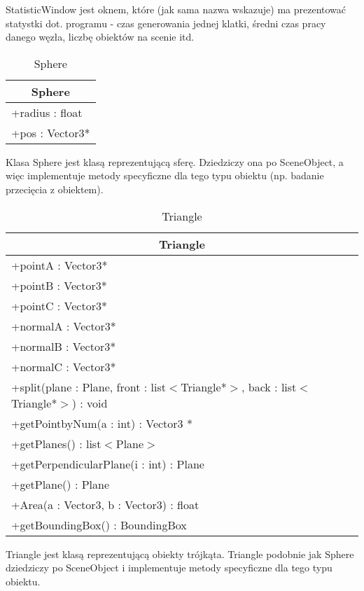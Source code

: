 StatisticWindow jest oknem, które (jak sama nazwa wskazuje) ma prezentować statystki dot. programu - czas generowania jednej klatki, średni czas pracy danego węzła, liczbę obiektów na scenie itd.

\begin{longtable}{|p{16cm}|}
    \caption{Sphere} \label{tab:Sphere} \\ \hline
    \multicolumn{1}{|c|}{Sphere} \\ \hline
    +radius : float \\
    +pos : Vector3* \\
    \hline
\end{longtable}

Klasa Sphere jest klasą reprezentującą sferę. Dziedziczy ona po SceneObject, a więc implementuje metody specyficzne dla tego typu obiektu (np. badanie przecięcia z obiektem).

\begin{longtable}{|p{16cm}|}
    \caption{Triangle} \label{tab:Triangle} \\ \hline
    \multicolumn{1}{|c|}{Triangle} \\ \hline
    +pointA : Vector3* \\
    +pointB : Vector3* \\
    +pointC : Vector3* \\
    +normalA : Vector3* \\
    +normalB : Vector3* \\
    +normalC : Vector3* \\
    \hline
	+split(plane : Plane, front : list$<$Triangle*$>$, back : list$<$Triangle*$>$) : void \\ 
	+getPointbyNum(a : int) : Vector3 * \\
	+getPlanes() : list$<$Plane$>$ \\
	+getPerpendicularPlane(i : int) : Plane \\
	+getPlane() : Plane \\
	+Area(a : Vector3, b : Vector3) : float \\
	+getBoundingBox() : BoundingBox \\
	\hline
\end{longtable}

Triangle jest klasą reprezentującą obiekty trójkąta. Triangle podobnie jak Sphere dziedziczy po SceneObject i implementuje metody specyficzne dla tego typu obiektu.

